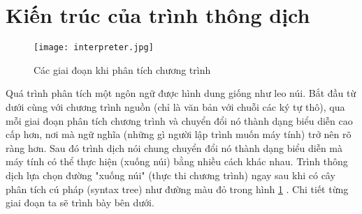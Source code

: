 \section{Kiến trúc của trình thông dịch}
\begin{figure}[h]
    \texttt{[image: interpreter.jpg]}   
    \centering
    \caption{Các giai đoạn khi phân tích chương trình} 
    \label{fig:stages}
\end{figure}

Quá trình phân tích một ngôn ngữ được hình dung giống như leo núi. Bắt đầu từ dưới cùng với chương trình nguồn (chỉ là văn bản với chuỗi các ký tự thô), qua mỗi giai đoạn phân tích chương trình và chuyển đổi nó thành dạng biểu diễn cao cấp hơn, nơi mà ngữ nghĩa (những gì người lập trình muốn máy tính) trở nên rõ ràng hơn. Sau đó trình dịch nói chung chuyển đổi nó thành dạng biểu diễn mà máy tính có thể thực hiện (xuống núi) bằng nhiều cách khác nhau. Trình thông dịch lựa chọn đường "xuống núi" (thực thi chương trình) ngay sau khi có cây phân tích cú pháp (syntax tree) như đường màu đỏ trong hình \ref{fig:stages} \cite{craftinginterpreters}. Chi tiết từng giai đoạn ta sẽ trình bày bên dưới.







